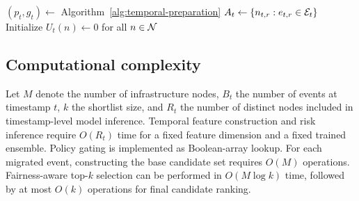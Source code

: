 \begin{algorithm*}[t]
\caption{CAGE-S online scheduling at timestamp $t$}
\label{alg:cage-complete}

$(p_t,g_t)\leftarrow$
Algorithm~\ref{alg:temporal-preparation}\;
$A_t\leftarrow
\{n_{t,r}:e_{t,r}\in\mathcal{E}_t\}$\;
Initialize $U_t(n)\leftarrow0$ for all $n\in\mathcal{N}$\;

\;
\end{algorithm*}

\subsection{Computational complexity}

Let $M$ denote the number of infrastructure nodes, $B_t$ the number of
events at timestamp $t$, $k$ the shortlist size, and $R_t$ the number of
distinct nodes included in timestamp-level model inference. Temporal feature construction and risk inference require
$O(R_t)$ time for a fixed feature dimension and a fixed trained ensemble.
Policy gating is implemented as Boolean-array lookup. For each migrated
event, constructing the base candidate set requires $O(M)$ operations.
Fairness-aware top-$k$ selection can be performed in
$O(M\log k)$ time, followed by at most $O(k)$ operations for final
candidate ranking.

